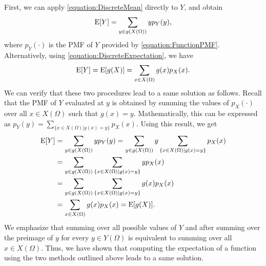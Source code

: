 First, we can apply \eqref{equation:DiscreteMean} directly to $Y$, and obtain
\begin{equation*}
\mathrm{E} [Y] = \sum_{y \in g(X(\Omega))} y p_Y(y),
\end{equation*}
where $p_Y (\cdot)$ is the PMF of $Y$ provided by \eqref{equation:FunctionPMF}.
Alternatively, using \eqref{equation:DiscreteExpectation}, we have
\begin{equation*}
\mathrm{E} [Y] = \mathrm{E} [g(X)] = \sum_{x \in X(\Omega)} g(x) p_X(x) .
\end{equation*}
We can verify that these two procedures lead to a same solution as follows.
Recall that the PMF of $Y$ evaluated at $y$ is obtained by summing the values of $p_X(\cdot)$ over all $x \in X(\Omega)$ such that $g(x) = y$.
Mathematically, this can be expressed as $p_Y (y) = \sum_{ \{x \in X(\Omega) | g(x) = y \} } p_X (x)$.
Using this result, we get
\begin{equation*}
\begin{split}
\mathrm{E} [Y] &= \sum_{y \in g(X(\Omega))} y p_Y(y)
= \sum_{y \in g(X(\Omega))} y
\sum_{\{x \in X(\Omega) | g(x) = y\}} p_X(x) \\
&= \sum_{y \in g(X(\Omega))}
\sum_{\{x \in X(\Omega) | g(x) = y\}} y p_X(x) \\
&= \sum_{y \in g(X(\Omega))}
\sum_{\{x \in X(\Omega) | g(x) = y\}} g(x) p_X(x) \\
&= \sum_{x \in X(\Omega)} g(x) p_X(x)
= \mathrm{E} [g(X)] .
\end{split}
\end{equation*}
We emphasize that summing over all possible values of $Y$ and after summing over the preimage of $y$ for every $y \in Y(\Omega)$ is equivalent to summing over all $x \in X(\Omega)$.
Thus, we have shown that computing the expectation of a function using the two methods outlined above leads to a same solution.

